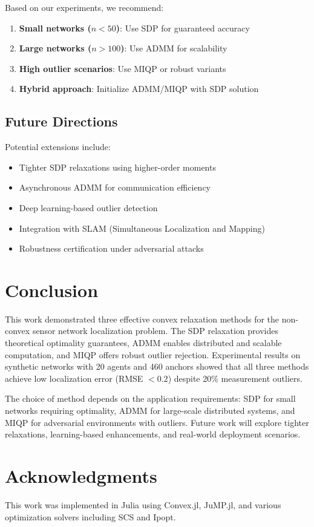 \documentclass[11pt,a4paper]{article}
\begin{document}
Based on our experiments, we recommend:

\begin{enumerate}
    \item \textbf{Small networks ($n < 50$)}: Use SDP for guaranteed accuracy
    \item \textbf{Large networks ($n > 100$)}: Use ADMM for scalability
    \item \textbf{High outlier scenarios}: Use MIQP or robust variants
    \item \textbf{Hybrid approach}: Initialize ADMM/MIQP with SDP solution
\end{enumerate}

\subsection{Future Directions}

Potential extensions include:
\begin{itemize}
    \item Tighter SDP relaxations using higher-order moments
    \item Asynchronous ADMM for communication efficiency
    \item Deep learning-based outlier detection
    \item Integration with SLAM (Simultaneous Localization and Mapping)
    \item Robustness certification under adversarial attacks
\end{itemize}

\section{Conclusion}

This work demonstrated three effective convex relaxation methods for the non-convex sensor network localization problem. The SDP relaxation provides theoretical optimality guarantees, ADMM enables distributed and scalable computation, and MIQP offers robust outlier rejection. Experimental results on synthetic networks with 20 agents and 460 anchors showed that all three methods achieve low localization error (RMSE $< 0.2$) despite 20\% measurement outliers.

The choice of method depends on the application requirements: SDP for small networks requiring optimality, ADMM for large-scale distributed systems, and MIQP for adversarial environments with outliers. Future work will explore tighter relaxations, learning-based enhancements, and real-world deployment scenarios.

\section*{Acknowledgments}

This work was implemented in Julia using Convex.jl, JuMP.jl, and various optimization solvers including SCS and Ipopt.


\end{document}
